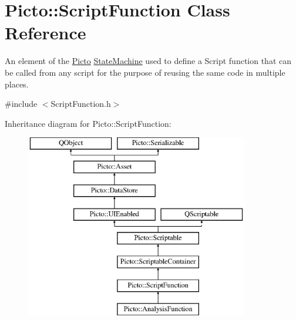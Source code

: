 \hypertarget{class_picto_1_1_script_function}{\section{Picto\-:\-:Script\-Function Class Reference}
\label{class_picto_1_1_script_function}
}


An element of the \hyperlink{namespace_picto}{Picto} \hyperlink{class_picto_1_1_state_machine}{State\-Machine} used to define a Script function that can be called from any script for the purpose of reusing the same code in multiple places.  




{\ttfamily \#include $<$Script\-Function.\-h$>$}

Inheritance diagram for Picto\-:\-:Script\-Function\-:\begin{figure}[H]
\begin{center}
\leavevmode
\includegraphics[height=8.000000cm]{class_picto_1_1_script_function}
\end{center}
\end{figure}
